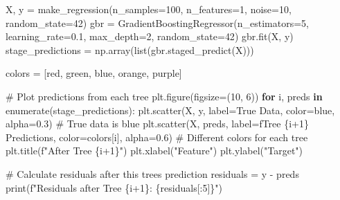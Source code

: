 \documentclass[
  letterpaper,
  DIV=11,
  numbers=noendperiod]{scrreprt}
\newenvironment{Shaded}{\begin{snugshade}}{\end{snugshade}}
\newcommand{\BuiltInTok}[1]{\textcolor[rgb]{0.00,0.23,0.31}{#1}}
\newcommand{\CommentTok}[1]{\textcolor[rgb]{0.37,0.37,0.37}{#1}}
\newcommand{\ControlFlowTok}[1]{\textcolor[rgb]{0.00,0.23,0.31}{\textbf{#1}}}
\newcommand{\DecValTok}[1]{\textcolor[rgb]{0.68,0.00,0.00}{#1}}
\newcommand{\FloatTok}[1]{\textcolor[rgb]{0.68,0.00,0.00}{#1}}
\newcommand{\KeywordTok}[1]{\textcolor[rgb]{0.00,0.23,0.31}{\textbf{#1}}}
\newcommand{\NormalTok}[1]{\textcolor[rgb]{0.00,0.23,0.31}{#1}}
\newcommand{\OperatorTok}[1]{\textcolor[rgb]{0.37,0.37,0.37}{#1}}
\newcommand{\SpecialCharTok}[1]{\textcolor[rgb]{0.37,0.37,0.37}{#1}}
\newcommand{\SpecialStringTok}[1]{\textcolor[rgb]{0.13,0.47,0.30}{#1}}
\newcommand{\StringTok}[1]{\textcolor[rgb]{0.13,0.47,0.30}{#1}}
\begin{document}
\begin{Shaded}
\begin{Highlighting}[]
\NormalTok{X, y }\OperatorTok{=}\NormalTok{ make\_regression(n\_samples}\OperatorTok{=}\DecValTok{100}\NormalTok{, n\_features}\OperatorTok{=}\DecValTok{1}\NormalTok{, noise}\OperatorTok{=}\DecValTok{10}\NormalTok{, random\_state}\OperatorTok{=}\DecValTok{42}\NormalTok{)}
\NormalTok{gbr }\OperatorTok{=}\NormalTok{ GradientBoostingRegressor(n\_estimators}\OperatorTok{=}\DecValTok{5}\NormalTok{, learning\_rate}\OperatorTok{=}\FloatTok{0.1}\NormalTok{, max\_depth}\OperatorTok{=}\DecValTok{2}\NormalTok{, random\_state}\OperatorTok{=}\DecValTok{42}\NormalTok{)}
\NormalTok{gbr.fit(X, y)}
\NormalTok{stage\_predictions }\OperatorTok{=}\NormalTok{ np.array(}\BuiltInTok{list}\NormalTok{(gbr.staged\_predict(X)))}

\NormalTok{colors }\OperatorTok{=}\NormalTok{ [}\StringTok{\textquotesingle{}red\textquotesingle{}}\NormalTok{, }\StringTok{\textquotesingle{}green\textquotesingle{}}\NormalTok{, }\StringTok{\textquotesingle{}blue\textquotesingle{}}\NormalTok{, }\StringTok{\textquotesingle{}orange\textquotesingle{}}\NormalTok{, }\StringTok{\textquotesingle{}purple\textquotesingle{}}\NormalTok{]}

\CommentTok{\# Plot predictions from each tree}
\NormalTok{plt.figure(figsize}\OperatorTok{=}\NormalTok{(}\DecValTok{10}\NormalTok{, }\DecValTok{6}\NormalTok{))}
\ControlFlowTok{for}\NormalTok{ i, preds }\KeywordTok{in} \BuiltInTok{enumerate}\NormalTok{(stage\_predictions):}
\NormalTok{    plt.scatter(X, y, label}\OperatorTok{=}\StringTok{\textquotesingle{}True Data\textquotesingle{}}\NormalTok{, color}\OperatorTok{=}\StringTok{\textquotesingle{}blue\textquotesingle{}}\NormalTok{, alpha}\OperatorTok{=}\FloatTok{0.3}\NormalTok{)  }\CommentTok{\# True data is blue}
\NormalTok{    plt.scatter(X, preds, label}\OperatorTok{=}\SpecialStringTok{f\textquotesingle{}Tree }\SpecialCharTok{\{}\NormalTok{i}\OperatorTok{+}\DecValTok{1}\SpecialCharTok{\}}\SpecialStringTok{ Predictions\textquotesingle{}}\NormalTok{, color}\OperatorTok{=}\NormalTok{colors[i], alpha}\OperatorTok{=}\FloatTok{0.6}\NormalTok{)  }\CommentTok{\# Different colors for each tree}
\NormalTok{    plt.title(}\SpecialStringTok{f"After Tree }\SpecialCharTok{\{}\NormalTok{i}\OperatorTok{+}\DecValTok{1}\SpecialCharTok{\}}\SpecialStringTok{"}\NormalTok{)}
\NormalTok{    plt.xlabel(}\StringTok{"Feature"}\NormalTok{)}
\NormalTok{    plt.ylabel(}\StringTok{"Target"}\NormalTok{)}
    
    \CommentTok{\# Calculate residuals after this tree\textquotesingle{}s prediction}
\NormalTok{    residuals }\OperatorTok{=}\NormalTok{ y }\OperatorTok{{-}}\NormalTok{ preds}
    \BuiltInTok{print}\NormalTok{(}\SpecialStringTok{f"Residuals after Tree }\SpecialCharTok{\{}\NormalTok{i}\OperatorTok{+}\DecValTok{1}\SpecialCharTok{\}}\SpecialStringTok{: }\SpecialCharTok{\{}\NormalTok{residuals[:}\DecValTok{5}\NormalTok{]}\SpecialCharTok{\}}\SpecialStringTok{"}\NormalTok{)}


\end{Highlighting}
\end{Shaded}
\end{document}
